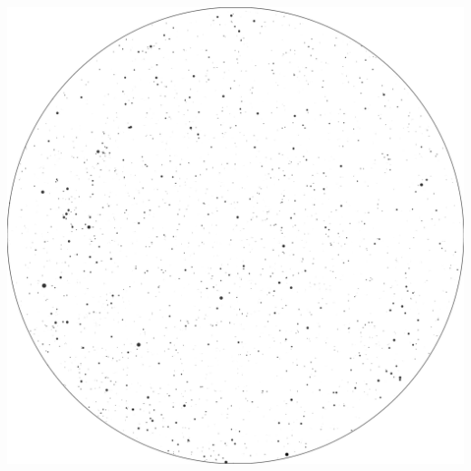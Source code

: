 \documentclass{./SAS-class-skygen}
\begin{document}
	\vspace{0.5cm}
    \begin{center}
    \includegraphics[width=\textwidth]{./pics/skychart8.png}
    \end{center}
    
    
\end{document}
